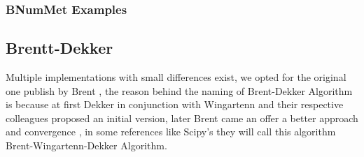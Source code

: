 \subsubsection*{BNumMet Examples}


\subsection*{Brentt-Dekker}
Multiple implementations with small differences exist, we opted for the original one publish by Brent \cite{brent2002algorithms}, the reason behind the naming of Brent-Dekker Algorithm is because at first Dekker in conjunction with Wingartenn and their respective colleagues proposed an initial version, later Brent came an offer a better approach and convergence \cite{Press2007}, in some references like Scipy's they will call this algorithm Brent-Wingartenn-Dekker Algorithm.


